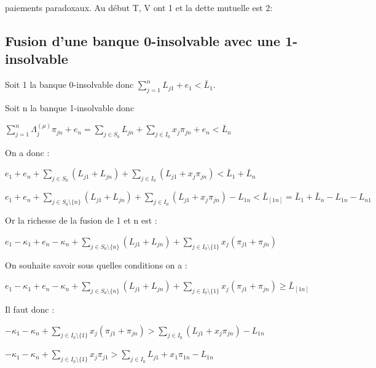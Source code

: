 \documentclass[11pt,oneside,twocolumn]{article}
\begin{document}
paiements paradoxaux. Au début T, V ont 1 et la dette mutuelle est 2:


\subsection{Fusion d'une banque 0-insolvable avec une 1-insolvable}

Soit 1 la banque 0-insolvable donc
$\sum_{j=1}^{n} L_{j1} + e_{1} < \bar L_{1}$.

Soit n la banque 1-insolvable donc

$\sum_{j=1}^{n} \Lambda^{(\mu)}_{j} \pi_{jn} + e_{n} = \sum_{j \in S_{0}} L_{jn} + \sum_{j \in I_{0}} x_{j} \pi_{jn} + e_{n} < \bar L_{n}$

On a donc :

$e_{1} + e_{n} + \sum_{j \in S_{0}} (L_{j1} + L_{jn}) + \sum_{j \in I_{0}} (L_{j1} + x_{j} \pi_{jn})  < \bar L_{1} +\bar L_{n}$

$e_{1} + e_{n} + \sum_{j \in S_{0}\setminus \lbrace n \rbrace} (L_{j1} + L_{jn}) + \sum_{j \in I_{0}} (L_{j1} + x_{j} \pi_{jn}) - L_{1n} < \bar L_{\left[1n \right]} = \bar L_{1} +\bar L_{n} - L_{1n} - L_{n1}$

Or la richesse de la fusion de 1 et n est :

$e_{1} - \kappa_{1} + e_{n} - \kappa_{n} + \sum_{j \in S_{0}\setminus \lbrace n \rbrace} (L_{j1} + L_{jn}) + \sum_{j \in I_{0}\setminus \lbrace 1 \rbrace} x_{j}(\pi_{j1} + \pi_{jn})$

On souhaite savoir sous quelles conditions on a :

$e_{1} - \kappa_{1} + e_{n} - \kappa_{n} + \sum_{j \in S_{0}\setminus \lbrace n \rbrace} (L_{j1} + L_{jn}) + \sum_{j \in I_{0}\setminus \lbrace 1 \rbrace} x_{j}(\pi_{j1} + \pi_{jn}) \geq \bar L_{\left[1n \right]}$

Il faut donc :

$- \kappa_{1} - \kappa_{n} + \sum_{j \in I_{0}\setminus \lbrace 1 \rbrace} x_{j}(\pi_{j1} + \pi_{jn}) > \sum_{j \in I_{0}} (L_{j1} + x_{j} \pi_{jn}) - L_{1n}$

$- \kappa_{1} - \kappa_{n} + \sum_{j \in I_{0}\setminus \lbrace 1 \rbrace} x_{j} \pi_{j1} > \sum_{j \in I_{0}} L_{j1} + x_{1} \pi_{1n} - L_{1n}$
\end{document}

